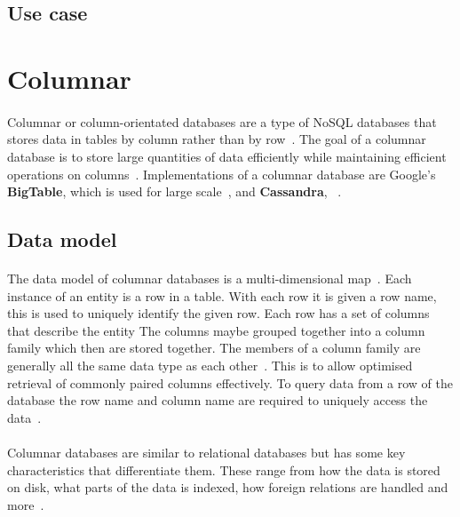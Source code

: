 \documentclass{CRPITStyle}
\renewcommand{\cite}{\citep}
\begin{document}
\subsection{Use case}

\cite{nosql_performance}


\section{Columnar}

\paragraph{}
Columnar or column-orientated databases are a type of NoSQL databases that
stores data in tables by column rather than by row~\cite{nosql_survey}.
The goal of a columnar database is to store large quantities of data efficiently
while maintaining efficient operations on columns~\cite{nosql_survey,nosql_eval}.
Implementations of a columnar database are Google's
\textbf{BigTable}, which is used for large scale~\cite{bigtable}, and
\textbf{Cassandra}, ~\cite{cassandra}.

\subsection{Data model}

\paragraph{}
The data model of columnar databases is a multi-dimensional
map~\cite{bigtable,nosql_eval}.
Each instance of an entity is a row in a table.
With each row it is given a row name, this is used to uniquely identify the
given row.
Each row has a set of columns that describe the entity
The columns maybe grouped together into a column family which then are
stored together.
The members of a column family are generally all the same data type as each
other~\cite{bigtable}.
This is to allow optimised retrieval of commonly paired columns effectively.
To query data from a row of the database the row name and column name are
required to uniquely access the data~\cite{bigtable}.

\paragraph{}
Columnar databases are similar to relational databases but has some key
characteristics that differentiate them.
These range from how the data is stored on disk, what parts of the
data is indexed, how foreign relations are handled and more~\cite{nosql_survey}.
\end{document}
